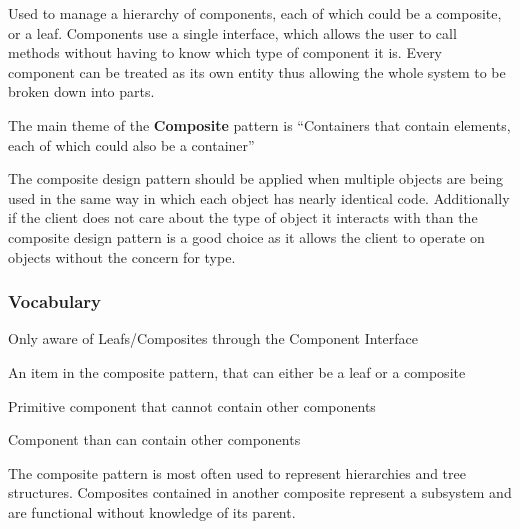 \begin{summary}
Used to manage a hierarchy of components, each of which could be a composite,
or a leaf. Components use a single interface, which allows the user to call
methods without having to know which type of component it is. Every component
can be treated as its own entity thus allowing the whole system to be broken
down into parts.  

The main theme of the {\bf Composite} pattern is ``Containers that contain elements,
each of which could also be a container''

The composite design pattern should be applied when multiple objects are being
used in the same way in which each object has nearly identical code.
Additionally if the client does not care about the type of object it interacts
with than the composite design pattern is a good choice as it allows the client
to operate on objects without the concern for type.
\end{summary}

\subsubsection{Vocabulary}
\begin{description}[noitemsep]
\item[Client] Only aware of Leafs/Composites through the Component Interface
\item[Component] An item in the composite pattern, that can either be a leaf or a composite
\item[Leaf] Primitive component that cannot contain other components
\item[Composite] Component than can contain other components
\item[Topology] The composite pattern is most often used to represent
hierarchies and tree structures. Composites contained in another composite
represent a subsystem and are functional without knowledge of its parent.
\end{description}


